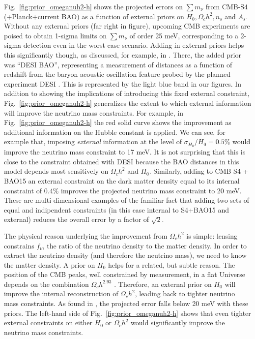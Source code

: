 \documentclass[aps,prd,reprint,superscriptaddress,nofootinbib,floatfix]{revtex4-1}
\newcommand{\reffig}[1]{Fig.~\ref{fig:#1}}
\begin{document}

\reffig{prior_omeganuh2-h} shows the projected errors on $\sum m_\nu$ from CMB-S4 (+Planck+current BAO) as a function of external priors on $H_{0}, \Omega_{c}h^{2}, n_s$ and $A_s$. 
Without any external priors (far right in figure), upcoming CMB experiments are poised to obtain 1-sigma limits on $\sum m_\nu$ of order 25 meV, corresponding to a 2-sigma detection even in the worst case scenario. Adding in external priors helps this significantly though, as discussed, for example, in \cite{di-valentino:2015,2013arXiv1309.5383A,pan:2015a,allison:2015}. 
There, the added prior was ``DESI BAO'', representing a measurement of distances as a function of redshift from the baryon acoustic oscillation feature probed by the planned experiment DESI \cite{levi:2013}. This is represented by the light blue band in our figures. In addition to showing the implications of introducing this fixed external constraint, \reffig{prior_omeganuh2-h} generalizes the extent to which external information will improve the neutrino mass constraints. For example, in \reffig{prior_omeganuh2-h} the red solid curve shows the improvement as additional information on the Hubble constant is applied. We can see, for example that, imposing {\it external} information at the level of $\sigma_{H_0}/H_0=0.5\%$ would improve the neutrino mass constraint to 17 meV. It is not surprising that this is close to the constraint obtained with DESI because the BAO distances in this model depends most sensitively on $\Omega_ch^2$ and $H_{0}$.
Similarly, adding to CMB S4 + BAO15 an external constraint on the dark matter density equal to its internal constraint of $0.4\%$ improves the projected neutrino mass constraint to 20 meV. These are multi-dimensional examples of the familiar fact that adding two sets of equal and indipendent constraints (in this case internal to S4+BAO15 and external) reduces the overall error by a factor of $\sqrt{2}$. 

The physical reason underlying the improvement from $\Omega_ch^2$ is simple: lensing constrains $f_\nu$, the ratio of the neutrino density to the matter density. In order to extract the neutrino density (and therefore the neutrino mass), we need to know the matter density. A prior on $H_{0}$ helps for a related, but subtle reason. 
The position of the CMB peaks, well constrained by measurement, in a flat Universe depends on the combination $\Omega_ch^{2.93}$ \cite{planck-collaboration:2014}.
Therefore, an external prior on $H_{0}$ will improve the internal reconstruction of $\Omega_ch^2$, leading back to tighter neutrino mass constraints.
As found in \cite{2013arXiv1309.5383A,pan:2015a,allison:2015}, the projected error falls below 20 meV with these priors. 
The left-hand side of \reffig{prior_omeganuh2-h} shows that even tighter external constraints on either $H_0$ or $\Omega_ch^2$ would significantly improve the neutrino mass constraints.
\end{document}
